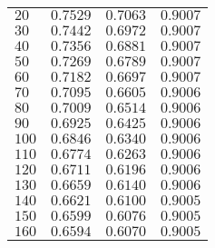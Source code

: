 \begin{center}
\begin{supertabular}{C{3cm}C{3cm}C{3cm}C{3cm}}
        $20$                      & $0.7529$              & $0.7063$             & $0.9007$        \\  

        $30$                      & $0.7442$              & $0.6972$             & $0.9007$        \\ 

        $40$                      & $0.7356$              & $0.6881$             & $0.9007$        \\ 

        $50$                      & $0.7269$              & $0.6789$             & $0.9007$        \\  

        $60$                      & $0.7182$              & $0.6697$             & $0.9007$        \\ 

        $70$                      & $0.7095$              & $0.6605$             & $0.9006$        \\ 

        $80$                      & $0.7009$              & $0.6514$             & $0.9006$        \\  

        $90$                      & $0.6925$              & $0.6425$             & $0.9006$        \\  

        $100$                    & $0.6846$              & $0.6340$             & $0.9006$        \\  

        $110$                    & $0.6774$              & $0.6263$             & $0.9006$        \\  

        $120$                    & $0.6711$              & $0.6196$             & $0.9006$        \\ 

        $130$                    & $0.6659$              & $0.6140$             & $0.9006$        \\  

        $140$                    & $0.6621$              & $0.6100$             & $0.9005$        \\  

        $150$                    & $0.6599$              & $0.6076$             & $0.9005$        \\ 

        $160$                    & $0.6594$              & $0.6070$             & $0.9005$        \\  


\end{supertabular}
\end{center}
